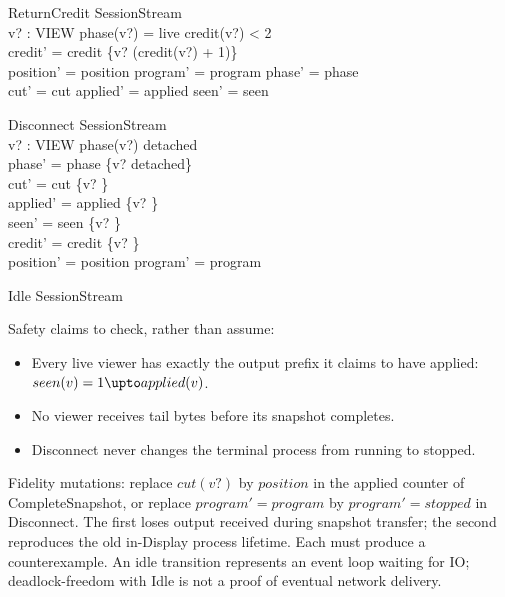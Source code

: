 \documentclass[a4paper,10pt]{article}
\begin{document}
\begin{schema}{ReturnCredit}
\Delta SessionStream \\
v? : VIEW
\where
phase(v?) = live \land credit(v?) < 2 \\
credit' = credit \oplus \{v? \mapsto (credit(v?) + 1)\} \\
position' = position \land program' = program \land phase' = phase \\
cut' = cut \land applied' = applied \land seen' = seen
\end{schema}

\begin{schema}{Disconnect}
\Delta SessionStream \\
v? : VIEW
\where
phase(v?) \neq detached \\
phase' = phase \oplus \{v? \mapsto detached\} \\
cut' = cut \oplus \{v? \} \\
applied' = applied \oplus \{v? \} \\
seen' = seen \oplus \{v? \mapsto \emptyset\} \\
credit' = credit \oplus \{v? \} \\
position' = position \land program' = program
\end{schema}

\begin{schema}{Idle}
\Xi SessionStream
\end{schema}

Safety claims to check, rather than assume:
\begin{itemize}
\item Every live viewer has exactly the output prefix it claims to have
      applied: $seen(v) = 1 \upto applied(v)$.
\item No viewer receives tail bytes before its snapshot completes.
\item Disconnect never changes the terminal process from running to stopped.
\end{itemize}

Fidelity mutations: replace $cut(v?)$ by $position$ in the applied counter of
CompleteSnapshot, or replace $program'=program$ by $program'=stopped$ in
Disconnect. The first loses output received during snapshot transfer; the
second reproduces the old in-Display process lifetime. Each must produce a
counterexample. An idle transition represents an event loop waiting for IO;
deadlock-freedom with Idle is not a proof of eventual network delivery.
\end{document}
